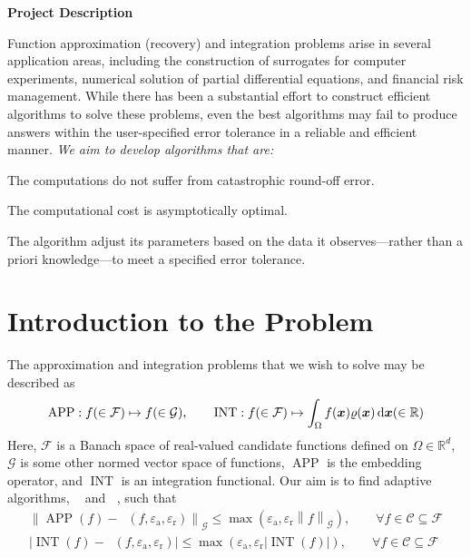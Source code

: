 \documentclass[11pt]{NSFamsart}
\def\reals{{\mathbb{R}}}
\DeclareMathOperator{\APP}{APP}
\DeclareMathOperator{\INT}{INT}
\DeclareMathOperator{\hAPP}{\widehat{\APP}}
\DeclareMathOperator{\hINT}{\widehat{\INT}}
\newcommand{\bx}{{\boldsymbol{x}}}
\def\dif{\textup{d}}
\newcommand{\calc}{{\mathcal{C}}}
\newcommand{\calf}{{\mathcal{F}}}
\newcommand{\calg}{{\mathcal{G}}}
\def\abs#1{\ensuremath{\left \lvert #1 \right \rvert}}
\newcommand{\norm}[2][{}]{\ensuremath{\left \lVert #2 \right \rVert}_{#1}}
\newcommand{\abstol}{\varepsilon_{\text{a}}}
\newcommand{\reltol}{\varepsilon_{\text{r}}}
\begin{document}

\centerline{\Large \bf Project Description}

Function approximation (recovery) and integration problems arise in several application areas, including the construction of surrogates for computer experiments, numerical solution of partial differential equations, and financial risk management.  While there has been a substantial effort to construct efficient algorithms to solve these problems, even the best algorithms may fail to produce answers within the user-specified error tolerance in a reliable and efficient manner.  \emph{We aim to develop algorithms that are:}
\begin{description}[leftmargin=2.5ex]
\item[Stable] The computations do not suffer from catastrophic round-off error.

\item[Efficient] The computational cost is asymptotically optimal.

\item[Adaptive] The algorithm adjust its parameters based on the data it observes---rather than a priori knowledge---to meet a specified error tolerance. 
\end{description}

\section{Introduction to the Problem}
The approximation and integration problems that we wish to solve may be described as 
\begin{equation}
\APP: f (\in \calf) \mapsto f (\in \calg), \qquad \INT: f (\in \calf) \mapsto \int_{\Omega} f(\bx) \varrho(\bx) \, \dif \bx (\in \reals)
\end{equation}
Here, $\calf$ is a Banach space of real-valued candidate functions defined on $\Omega \in \reals^d$, $\calg$ is some other normed vector space of functions, $\APP$ is the embedding operator, and $\INT$ is an integration functional.  Our aim is to find adaptive algorithms, $\hAPP$ and $\hINT$, such that 
\begin{subequations}
\begin{gather}
\norm[\calg]{\APP(f)-\hAPP(f,\abstol,\reltol)} \le \max(\abstol,\reltol \norm[\calg]{f}), \qquad \forall f \in \calc \subseteq \calf\\
\abs{\INT(f) -\hINT(f,\abstol,\reltol)} \le \max(\abstol,\reltol \abs{\INT(f)}), \qquad \forall f \in \calc \subseteq \calf
\end{gather}
\end{subequations}
\end{document}
